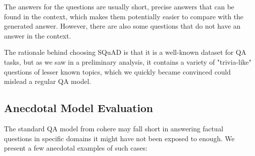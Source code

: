 \documentclass[12pt]{article}
\begin{document}
The answers for the questions are usually short, precise answers that can be found in the context, which makes them potentially easier to compare with the generated answer. However, there are also some questions that do not have an answer in the context.

The rationale behind choosing SQuAD is that it is a well-known dataset for QA tasks, but as we saw in a preliminary analysis, it contains a variety of "trivia-like" questions of lesser known topics, which we quickly became convinced could mislead a regular QA model.

\subsection{Anecdotal Model Evaluation}

The standard QA model from cohere may fall short in answering factual questions in specific domains it might have not been exposed to enough. We present a few anecdotal examples of such cases:
\end{document}

